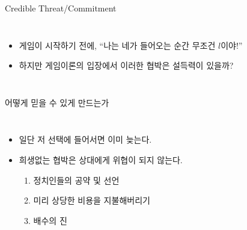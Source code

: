 \documentclass[final]{beamer}
\begin{document}
\begin{frame}[t]{Credible Threat/Commitment}
	\begin{columns}[c]
	\column{20em}
	\begin{itemize}
		\item 게임이 시작하기 전에, 
		``나는 네가 들어오는 순간 무조건 $l$이야!''
		\item 하지만 게임이론의 입장에서 이러한 협박은 설득력이 있을까? 
	\end{itemize}
	\column{13em} 
	\end{columns}
\end{frame}

\begin{frame}[t]{어떻게 믿을 수 있게 만드는가}
	\begin{columns}[c]
	\column{20em}
	\begin{itemize}
		\item 일단 저 선택에 들어서면 이미 늦는다. 
		\item 희생없는 협박은 상대에게 위협이 되지 않는다. 
		\begin{enumerate}
			\item 정치인들의 공약 및 선언
			\item 미리 상당한 비용을 지불해버리기
			\item 배수의 진
		\end{enumerate}
	\end{itemize}
	\column{13em} 
	\end{columns}
\end{frame}
\end{document}

